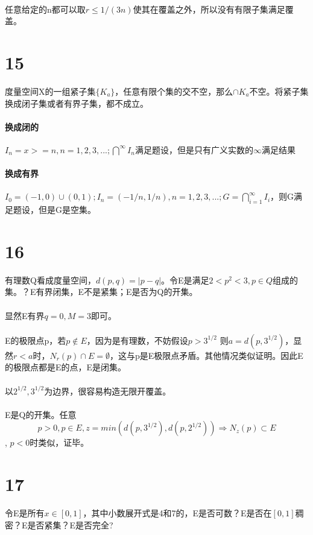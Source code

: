 \paragraph{} 任意给定的n都可以取$ r \le 1/(3n)$使其在覆盖之外，所以没有有限子集满足覆盖。
\section*{15} 度量空间X的一组紧子集$\{K_a\}$，任意有限个集的交不空，那么$\cap{K_a}$不空。将紧子集换成闭子集或者有界子集，都不成立。
\paragraph{换成闭的} $I_n = x >=n, n = 1, 2, 3, ...; \bigcap^{\infty}{I_n}$满足题设，但是只有广义实数的$\infty$满足结果
\paragraph{换成有界} $I_0=(-1, 0) \cup (0, 1); I_n=(-1/n, 1/n), n=1, 2, 3, ...; G = \bigcap_{i=1}^{\infty}{I_i} $，则G满足题设，但是G是空集。
\section*{16} 有理数Q看成度量空间，$d(p, q) = |p - q|$。令E是满足$2 < p^2 < 3, p \in Q$组成的集。？E有界闭集，E不是紧集；E是否为Q的开集。
\paragraph{} 显然E有界$q=0, M= 3$即可。
\paragraph{} E的极限点p，若$p \notin E$，因为是有理数，不妨假设$p > 3^{1/2}$ 则$ a = d(p, 3^{1/2})$，显然$r < a$时，$ N_r(p) \cap E = \emptyset$，这与p是E极限点矛盾。其他情况类似证明。因此E的极限点都是E的点，E是闭集。
\paragraph{} 以$2^{1/2}, 3^{1/2}$为边界，很容易构造无限开覆盖。
\paragraph{} E是Q的开集。任意$$p > 0, p \in E, z = min(d(p, 3^{1/2}), d(p, 2^{1/2})) \Rightarrow N_z(p) \subset E $$, $p < 0$时类似，证毕。
\section*{17} 令E是所有$x \in [0, 1]$，其中小数展开式是4和7的，E是否可数？E是否在$[0,1]$稠密？E是否紧集？E是否完全?
